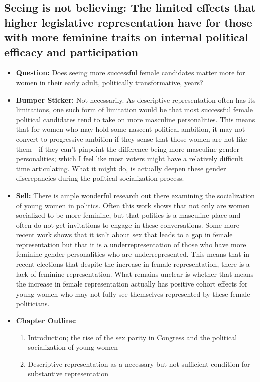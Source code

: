 \documentclass[12pt]{article}
\begin{document}
\subsection{Seeing is not believing: The limited effects that higher legislative representation have for those with more feminine traits on internal political efficacy and participation}
    \begin{itemize}
        \item \textbf{Question:} Does seeing more successful female candidates matter more for women in their early adult, politically transformative, years?
        \item \textbf{Bumper Sticker:} Not necessarily. As descriptive representation often has its limitations, one such form of limitation would be that most successful female political candidates tend to take on more masculine personalities. This means that for women who may hold some nascent political ambition, it may not convert to progressive ambition if they sense that those women are not like them - if they can't pinpoint the difference being more masculine gender personalities; which I feel like most voters might have a relatively difficult time articulating. What it might do, is actually deepen these gender discrepancies during the political socialization process.
        \item \textbf{Sell:} There is ample wonderful research out there examining the socialization of young women in politics. Often this work shows that not only are women socialized to be more feminine, but that politics is a masculine place and often do not get invitations to engage in these conversations. Some more recent work shows that it isn't about sex that leads to a gap in female representation but that it is a underrepresentation of those who have more feminine gender personalities who are underrepresented. This means that in recent elections that despite the increase in female representation, there is a lack of feminine representation. What remains unclear is whether that means the increase in female representation actually has positive cohort effects for young women who may not fully see themselves represented by these female politicians.
        \item \textbf{Chapter Outline:}
        \begin{enumerate}
            \item Introduction; the rise of the sex parity in Congress and the political socialization of young women
            \item Descriptive representation as a necessary but not sufficient condition for substantive representation

\end{enumerate}
\end{itemize}
\end{document}

